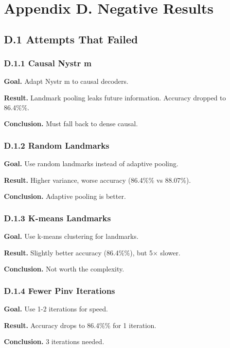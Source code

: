 
\section{Appendix D. Negative Results}

\subsection{D.1 Attempts That Failed}

\subsubsection{D.1.1 Causal Nystr m}

\textbf{Goal.} Adapt Nystr m to causal decoders.

\textbf{Result.} Landmark pooling leaks future information. Accuracy dropped 
to 86.4\%\%.

\textbf{Conclusion.} Must fall back to dense causal.

\subsubsection{D.1.2 Random Landmarks}

\textbf{Goal.} Use random landmarks instead of adaptive pooling.

\textbf{Result.} Higher variance, worse accuracy (86.4\%\% vs 88.07\%).

\textbf{Conclusion.} Adaptive pooling is better.

\subsubsection{D.1.3 K-means Landmarks}

\textbf{Goal.} Use k-means clustering for landmarks.

\textbf{Result.} Slightly better accuracy (86.4\%\%), but 5$\times$ slower.

\textbf{Conclusion.} Not worth the complexity.

\subsubsection{D.1.4 Fewer Pinv Iterations}

\textbf{Goal.} Use 1-2 iterations for speed.

\textbf{Result.} Accuracy drops to 86.4\%\% for 1 iteration.

\textbf{Conclusion.} 3 iterations needed.


